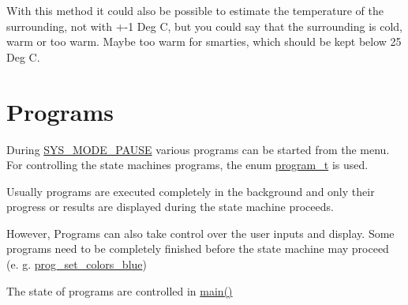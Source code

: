 With this method it could also be possible to estimate the temperature of the surrounding, not with +-1 Deg C, but you could say that the surrounding is cold, warm or too warm. Maybe too warm for smarties, which should be kept below 25 Deg C.\hypertarget{index_Programs}{}\section{Programs}\label{index_Programs}
During \hyperlink{system_8h_6e4cea4b6246f491c526211f5405627df1c8a041b6d3d46002d02ed0645a8ba2}{SYS\_\-MODE\_\-PAUSE} various programs can be started from the menu. For controlling the state machines programs, the enum \hyperlink{system_8h_6cfd37e27dfa4a49be0ab6d983f4fc55}{program\_\-t} is used.

Usually programs are executed completely in the background and only their progress or results are displayed during the state machine proceeds.

However, Programs can also take control over the user inputs and display. Some programs need to be completely finished before the state machine may proceed (e. g. \hyperlink{system_8h_6cfd37e27dfa4a49be0ab6d983f4fc55e7156e0e78e0f3ce9f2ce0d7bbe8bac5}{prog\_\-set\_\-colors\_\-blue})

The state of programs are controlled in \hyperlink{smarties2_8c_840291bc02cba5474a4cb46a9b9566fe}{main()} 
